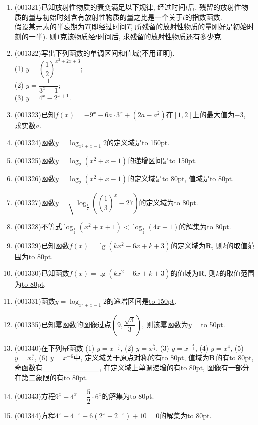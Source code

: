 \documentclass[10pt,a4paper]{article}
\newcommand{\blank}[1]{\underline{\hbox to #1pt{}}}
\begin{document}
\begin{enumerate}[1.]
\item {\tiny (001321)}已知放射性物质的衰变满足以下规律, 经过时间$t$后, 残留的放射性物质的量与初始时刻含有放射性物质的量之比是一个关于$t$的指数函数.\\ 
假设某元素的半衰期为$T$(即经过时间$T$, 所残留的放射性物质的量刚好是初始时刻的一半). 则$1$克该物质经$t$时间后, 求残留的放射性物质还有多少克.
\item {\tiny (001322)}写出下列函数的单调区间和值域(不用证明).\\ 
(1) $y=\left(\dfrac{1}{2}\right)^{x^2+2x+3}$;\\ 
(2) $y=\dfrac{1}{3^x-1}$;\\ 
(3) $y=4^x-2^{x+1}$.
\item {\tiny (001323)}已知$f(x)=-9^x-6a\cdot 3^x+(2a-a^2)$在$[1,2]$上的最大值为$-3$, 求实数$a$.
\item {\tiny (001324)}函数$y=\log_{x^2+x-1} 2$的定义域是\blank{150}.
\item {\tiny (001325)}函数$y=\log_2(x^2+x-1)$的递增区间是\blank{150}.
\item {\tiny (001326)}函数$y=\log_2(x^2+x-1)$的定义域是\blank{80}, 值域是\blank{80}.
\item {\tiny (001327)}函数$y=\sqrt{\log_{\frac{1}{2}}\left(\left(\dfrac{1}{3}\right)^x-27\right)}$的定义域为\blank{80}.
\item {\tiny (001328)}不等式$\log_{\frac{1}{2}}(x^2+x+1)<\log_{\frac{1}{2}}(4x-1)$的解集为\blank{80}.
\item {\tiny (001329)}已知函数$f(x)=\lg(kx^2-6x+k+3)$的定义域为$\mathbf{R}$, 则$k$的取值范围为\blank{80}.
\item {\tiny (001330)}已知函数$f(x)=\lg(kx^2-6x+k+3)$的值域为$\mathbf{R}$, 则$k$的取值范围为\blank{80}.
\item {\tiny (001331)}函数$y=\log_{x^2+x-1} 2$的递增区间是\blank{150}.
\item {\tiny (001335)}已知幂函数的图像过点$(9,\dfrac{\sqrt{3}}{3})$, 则该幂函数为$y=$\blank{50}.
\item {\tiny (001340)}在下列幂函数 (1) $y=x^{-\frac{3}{2}}$, (2) $y=x^{\frac{5}{4}}$, (3) $y=x^{-\frac{4}{3}}$, (4) $y=x^4$, (5) $y=x^{\frac{3}{7}}$, (6) $y=x^{-6}$中, 定义域关于原点对称的有\blank{80}, 值域为$\mathbf{R}$的有\blank{80}, 奇函数有$\blank{80}$, 在定义域上单调递增的有\blank{80}, 图像有一部分在第二象限的有\blank{80}.
\item {\tiny (001343)}方程$9^x+4^x=\dfrac{5}{2}\cdot 6^x$的解集为\blank{80}.
\item {\tiny (001344)}方程$4^x+4^{-x}-6(2^x+2^{-x})+10=0$的解集为\blank{80}.

\end{enumerate}
\end{document}
